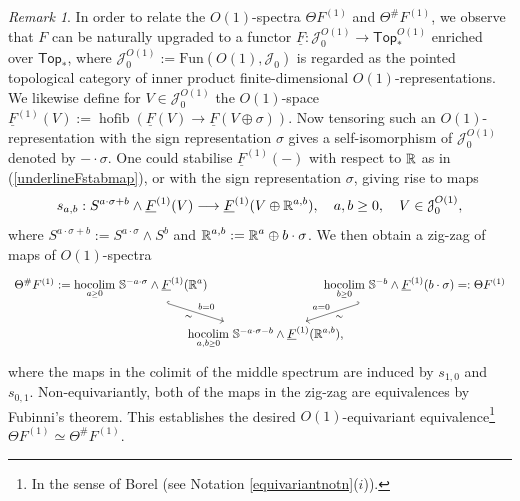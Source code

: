 \documentclass[a4paper, oneside]{amsart}
\newcommand{\hofib}{\operatorname{hofib}}
\newcommand{\1}{\mathds{1}}
\newcommand{\Top}{\mathsf{Top}}
\theoremstyle{remark}
\newtheorem{rem}[thm]{Remark}%
\theoremstyle{definition}
\newcommand{\R}{{\scaleobj{0.97}{\mathbb{R}}}}
\newcommand{\geqs}{\scaleobj{0.85}{\geq}}
\newcommand{\s}{\mathbb{S}}
\numberwithin{equation}{section}
\begin{document}
\begin{rem}
In order to relate the $O(1)$-spectra $\Theta F^{(1)}$ and $\Theta^\#F^{(1)}$,  we observe that $F$ can be naturally upgraded to a functor $\underline{F}: \mathcal J_0^{O(1)}\to \mathsf{Top}_*^{O(1)}$ enriched over $\Top_*$, where $\mathcal J_0^{O(1)}:=\mathrm{Fun}(O(1),\mathcal J_0)$ is regarded as the pointed topological category of inner product finite-dimensional $O(1)$-representations. We likewise define for $V\in \mathcal J_0^{O(1)}$ the $O(1)$-space $\underline{F}^{(1)}(V):=\hofib(\underline{F}(V)\to \underline{F}(V\oplus\sigma))$. Now tensoring such an $O(1)$-representation with the sign representation $\sigma$ gives a self-isomorphism of $\mathcal J_0^{O(1)}$ denoted by $-\cdot\sigma$. One could stabilise $\underline{F}^{(1)}(-)$ with respect to $\R$ as in (\ref{underlineFstabmap}), or with the sign representation $\sigma$, giving rise to maps 
$$
s_{a,b}: S^{a\cdot\sigma+b}\wedge \underline{F}^{(1)}(V)\longrightarrow \underline{F}^{(1)}(V\oplus \R^{a,b}), \quad a,b\geq 0,\quad V\in \mathcal J_0^{O(1)},
$$
where $S^{a\cdot\sigma+b}:=S^{a\cdot\sigma}\wedge S^b$ and $\R^{a,b}:=\R^{a}\oplus b\cdot\sigma$. We then obtain a zig-zag of maps of $O(1)$-spectra
\begin{equation}\label{Thetaheartzigzag}
\begin{tikzcd}[row sep = 15pt, column sep = -25pt]
\Theta^{\#}F^{(1)}:=\underset{a\geqs0}{\mathrm{hocolim}}\ \s^{-a\cdot\sigma} \wedge \underline{F}^{(1)}(\R^{a})\ar[hook, rd,"b=0", "\sim"'] & &\ar[hook', ld,"\sim","a=0"'] \underset{b\geqs 0}{\mathrm{hocolim}}\ \s^{-b} \wedge \underline{F}^{(1)}(b\cdot \sigma)=:\Theta F^{(1)}\\
&\underset{a,b\geqs0}{\mathrm{hocolim}}\ \s^{-a\cdot\sigma-b} \wedge \underline{F}^{(1)}(\R^{a,b}),&
\end{tikzcd}
\end{equation}
where the maps in the colimit of the middle spectrum are induced by $s_{1,0}$ and $s_{0,1}$. Non-equivariantly, both of the maps in the zig-zag are equivalences by Fubinni's theorem. This establishes the desired $O(1)$-equivariant equivalence\footnote{In the sense of Borel (see Notation \ref{equivariantnotn}($i$)).} $\Theta F^{(1)}\simeq \Theta^\#F^{(1)}$.
\end{rem}
\end{document}
